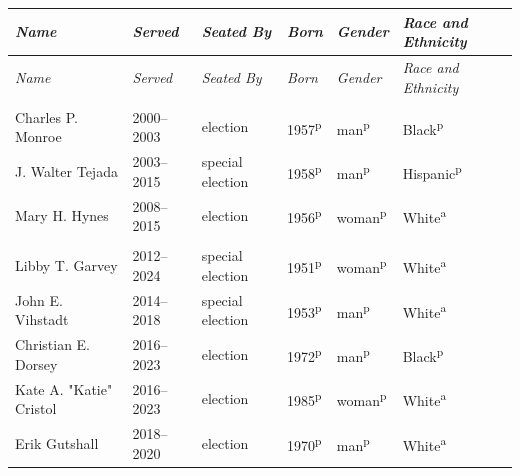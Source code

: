 \endgroup
\clearpage\begingroup
{}
\medskip
\footnotesize\setlength{\tabcolsep}{8pt}\setlength{\LTpre}{0pt}\setlength{\LTpost}{0pt}
\settowidth{\rcA}{Matthew D. "Matt" de Ferranti}
\settowidth{\rcB}{1870--1873}
\settowidth{\rcC}{special election}
\setlength{\rcslack}{\dimexpr(\textwidth-0.5pt-\rcA-\rcB-\rcC-\rcD-\rcE-\rcF-10\tabcolsep)/5\relax}
\addtolength{\rcA}{\rcslack}
\addtolength{\rcB}{\rcslack}
\addtolength{\rcC}{\rcslack}
\addtolength{\rcD}{\rcslack}
\addtolength{\rcE}{\rcslack}
\begin{longtable}{Q}
\toprule \textit{Name} & \textit{Served} & \textit{Seated By} & \textit{Born} & \textit{Gender} & \textit{Race and Ethnicity} \\ \midrule \endfirsthead
\toprule \textit{Name} & \textit{Served} & \textit{Seated By} & \textit{Born} & \textit{Gender} & \textit{Race and Ethnicity} \\ \midrule \endhead
\bottomrule \endfoot
{} \\*
Charles P. Monroe & 2000--2003 & election & 1957\textsuperscript{p} & man\textsuperscript{p} & Black\textsuperscript{p} \\*
J. Walter Tejada & 2003--2015 & special election & 1958\textsuperscript{p} & man\textsuperscript{p} & Hispanic\textsuperscript{p} \\*
Mary H. Hynes & 2008--2015 & election & 1956\textsuperscript{p} & woman\textsuperscript{p} & White\textsuperscript{a} \\
\addlinespace[1.4ex]
 \\*
Libby T. Garvey & 2012--2024 & special election & 1951\textsuperscript{p} & woman\textsuperscript{p} & White\textsuperscript{a} \\*
John E. Vihstadt & 2014--2018 & special election & 1953\textsuperscript{p} & man\textsuperscript{p} & White\textsuperscript{a} \\
Christian E. Dorsey & 2016--2023 & election & 1972\textsuperscript{p} & man\textsuperscript{p} & Black\textsuperscript{p} \\
Kate A. "Katie" Cristol & 2016--2023 & election & 1985\textsuperscript{p} & woman\textsuperscript{p} & White\textsuperscript{a} \\
Erik Gutshall & 2018--2020 & election & 1970\textsuperscript{p} & man\textsuperscript{p} & White\textsuperscript{a} \\*

\end{longtable}
